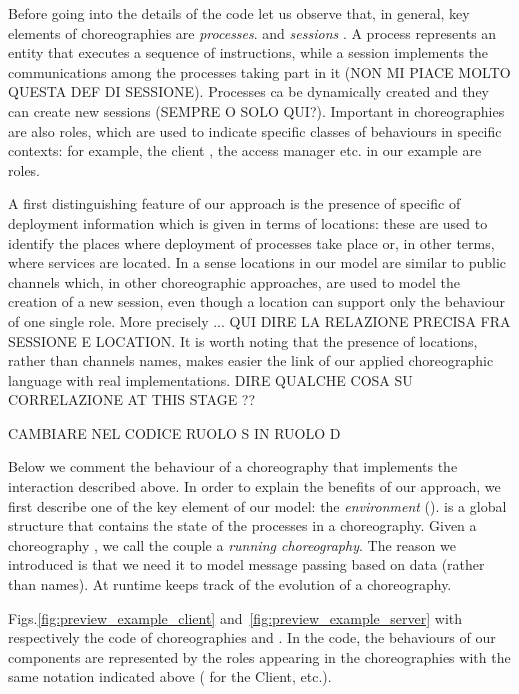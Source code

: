 Before going into the details of the code let us observe that, in general, key elements of choreographies are \emph{processes}.
and \emph{sessions} . A process represents an entity that executes a sequence of instructions, 
while a session implements the communications among the processes taking part in it (NON MI PIACE MOLTO 
QUESTA DEF DI SESSIONE).  Processes ca be dynamically created and they can create new sessions 
(SEMPRE O SOLO QUI?). 
Important in choreographies are also roles, which are used to indicate specific classes of behaviours in specific contexts: for example, the client , the access manager  etc. in our example are roles.  

A first distinguishing feature of our approach is the presence of specific of
deployment information which is given in terms of locations: these are used to
identify the places where deployment of processes take place or, in other
terms, where services are located. In a sense locations in our model are
similar to public channels which, in other choreographic approaches, are used
to model the creation of a new session, even though a location can support only
the behaviour of one single role. More precisely ... QUI DIRE LA RELAZIONE
PRECISA FRA SESSIONE E LOCATION. It is worth noting that the presence of
locations, rather than channels names, makes easier the link of our applied
choreographic language with real implementations. DIRE QUALCHE COSA SU
CORRELAZIONE AT THIS STAGE ??





CAMBIARE NEL CODICE RUOLO S IN RUOLO D

Below we comment the behaviour of a choreography that implements the
interaction described above. In order to explain the benefits of our approach,
we first describe one of the key element of our model: the \emph {environment}
().  is a global structure that contains the state of the processes
in a choreography. Given a choreography , we call the couple  a
\emph {running choreography}. The reason we introduced  is that we need
it to model message passing based on data (rather than names). At runtime
 keeps track of the evolution of a choreography.

Figs.\ref{fig:preview_example_client} and~\ref{fig:preview_example_server} with
respectively the code of choreographies  and . In the code, the
behaviours of our components are represented by the roles appearing in the
choreographies with the same notation indicated above ( for the
Client, etc.).

